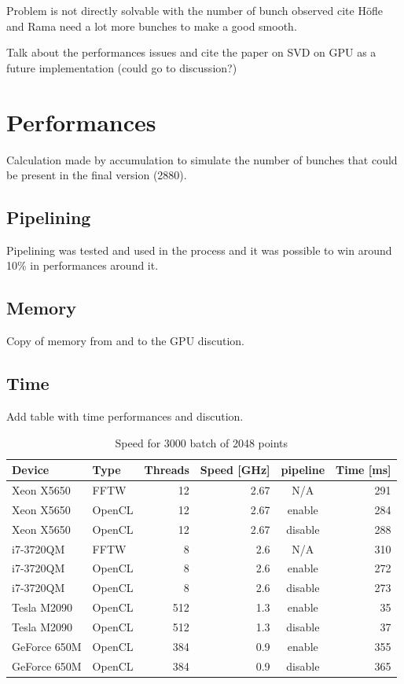Problem is not directly solvable with the number of bunch observed cite H{\"o}fle and Rama need a lot more bunches to make a good smooth\cite{calaga06}. 

Talk about the performances issues and cite the paper on SVD on GPU as a future implementation (could go to discussion?)\cite{Lahabar09}

\section{Performances}

Calculation made by accumulation to simulate the number of bunches that could be present in the final version (2880).

   \subsection{Pipelining}

	Pipelining was tested and used in the process and it was possible to win around 10\% in performances around it.

   \subsection{Memory}

	Copy of memory from and to the GPU discution.

   \subsection{Time}

	Add table with time performances and discution.

	\begin{table}[H]
		\caption{Speed for 3000 batch of 2048 points}
		\begin{tabular}{|l|lrrcr|}
			\hline
				Device & Type & Threads & Speed [GHz] & pipeline & Time [ms] \\
			\hline
			\hline
				Xeon X5650 & FFTW & 12 & 2.67 & N/A & 291 \\
				Xeon X5650 & OpenCL & 12 & 2.67 & enable & 284 \\
				Xeon X5650 & OpenCL & 12 & 2.67 & disable & 288 \\
			\hline
				i7-3720QM & FFTW & 8 & 2.6 & N/A & 310 \\
				i7-3720QM & OpenCL & 8 & 2.6 & enable & 272 \\
				i7-3720QM & OpenCL & 8 & 2.6 & disable & 273 \\
			\hline
			\hline
				Tesla M2090 & OpenCL & 512 & 1.3 & enable & 35 \\
				Tesla M2090 & OpenCL & 512 & 1.3 & disable & 37 \\
			\hline
				GeForce 650M & OpenCL & 384 & 0.9 & enable & 355 \\
				GeForce 650M & OpenCL & 384 & 0.9 & disable & 365 \\
			\hline
		\end{tabular}
	\end{table}

